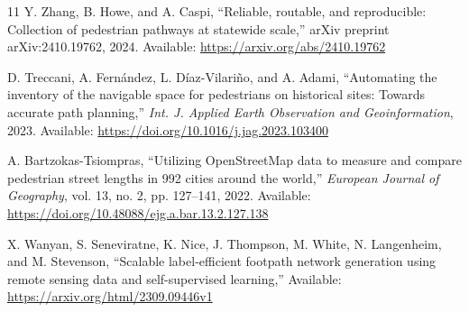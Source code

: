 \documentclass[conference]{IEEEtran}
\begin{document}
\begin{thebibliography}{11}
Y. Zhang, B. Howe, and A. Caspi,
``Reliable, routable, and reproducible: Collection of pedestrian
pathways at statewide scale,''
arXiv preprint arXiv:2410.19762, 2024. Available: \url{https://arxiv.org/abs/2410.19762}

D. Treccani, A. Fern\'andez, L. D\'iaz-Vilari\~no, and A. Adami,
``Automating the inventory of the navigable space for pedestrians
on historical sites: Towards accurate path planning,''
\emph{Int. J. Applied Earth Observation and Geoinformation},
2023. Available: \url{https://doi.org/10.1016/j.jag.2023.103400}

A. Bartzokas-Tsiompras,
``Utilizing {OpenStreetMap} data to measure and compare pedestrian
street lengths in 992 cities around the world,''
\emph{European Journal of Geography},
vol. 13, no. 2, pp. 127--141, 2022. Available: \url{https://doi.org/10.48088/ejg.a.bar.13.2.127.138}

X. Wanyan, S. Seneviratne, K. Nice, J. Thompson, M. White,
N. Langenheim, and M. Stevenson,
``Scalable label-efficient footpath network generation using
remote sensing data and self-supervised learning,''
Available: \url{https://arxiv.org/html/2309.09446v1}


\end{thebibliography}
\end{document}
